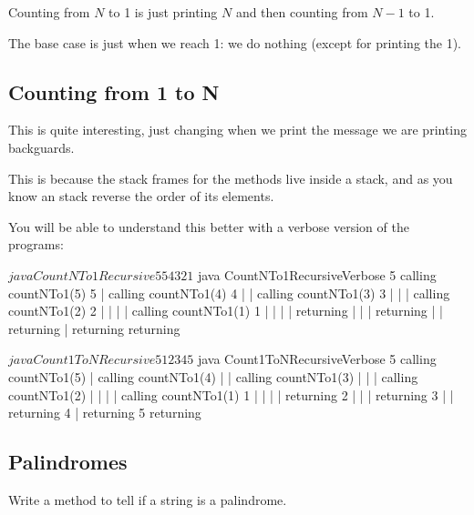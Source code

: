 \documentclass[a4paper, 9pt]{extarticle}
\begin{document}
Counting from $N$ to 1 is just printing $N$ and then counting from $N-1$ to 1.

The base case is just when we reach 1: we do nothing (except for printing the 1).

\subsection{Counting from 1 to N}

\begin{multicols}{2}
\columnbreak
\end{multicols}

This is quite interesting, just changing when we print the message we are
printing backguards.

This is because the stack frames for the methods live inside a stack, and as
you know an stack reverse the order of its elements.

You will be able to understand this better with a verbose version of the programs:

\newpage

\begin{multicols}{2}
  \begin{blackboard}
$ java CountNTo1Recursive 5
5
4
3
2
1
$ java CountNTo1RecursiveVerbose 5
calling countNTo1(5)
5
|  calling countNTo1(4)
4
|  |  calling countNTo1(3)
3
|  |  |  calling countNTo1(2)
2
|  |  |  |  calling countNTo1(1)
1
|  |  |  |  returning
|  |  |  returning
|  |  returning
|  returning
returning
\end{blackboard}
\columnbreak
  \begin{blackboard}
$ java Count1ToNRecursive 5
1
2
3
4
5
$ java Count1ToNRecursiveVerbose 5
calling countNTo1(5)
|  calling countNTo1(4)
|  |  calling countNTo1(3)
|  |  |  calling countNTo1(2)
|  |  |  |  calling countNTo1(1)
1
|  |  |  |  returning
2
|  |  |  returning
3
|  |  returning
4
|  returning
5
returning
\end{blackboard}
\end{multicols}



\subsection{Palindromes}

Write a method to tell if a string is a palindrome.
\end{document}
